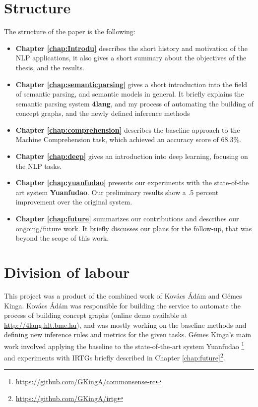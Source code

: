 \section{Structure}
The structure of the paper is the following:
\begin{itemize}
	\item \textbf{Chapter \ref{chap:Introdu}} describes the short history and motivation of the NLP applications, it also gives a short summary about the objectives of the thesis, and the results.
	\item \textbf{Chapter \ref{chap:semanticparsing}} gives a short introduction into the field of semantic parsing, and semantic models in general. It briefly explains the semantic parsing system \textbf{4lang}, and my process of automating the building of concept graphs, and the newly defined inference methods
	\item \textbf{Chapter \ref{chap:comprehension}} describes the baseline approach to the Machine Comprehension task, which achieved an accuracy score of $68.3\%$.
	\item \textbf{Chapter \ref{chap:deep}} gives an introduction into deep learning, focusing on the NLP tasks.
	\item \textbf{Chapter \ref{chap:yuanfudao}} presents our experiments with the state-of-the art system \textbf{Yuanfudao}. Our preliminary results show a .5 percent improvement over the original system.
	\item \textbf{Chapter \ref{chap:future}} summarizes our contributions and describes our ongoing/future work. It briefly discusses our plans for the follow-up, that was beyond the scope of this work.
\end{itemize}

\section{Division of labour}
This project was a product of the combined work of Kov\'acs \'Ad\'am and G\'emes Kinga. Kov\'acs \'Ad\'am was responsible for building the service to automate the process of building concept graphs (online demo available at \url{http://4lang.hlt.bme.hu}), and was mostly working on the baseline methods and defining new inference rules and metrics for the given tasks. G\'emes Kinga's main work involved applying the baseline to the state-of-the-art system Yuanfudao \cite{Wang:2018}\footnote{\url{https://github.com/GKingA/commonsense-rc}} and experiments with IRTGs briefly described in Chapter \ref{chap:future}\footnote{\url{https://github.com/GKingA/irtg}}.